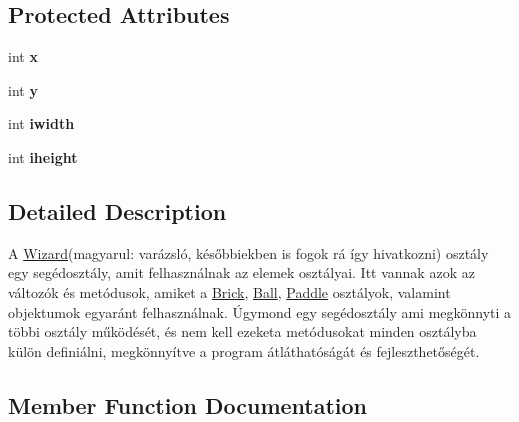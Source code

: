 \subsection*{Protected Attributes}
\begin{DoxyCompactItemize}
\item 
int {\bfseries x}\hypertarget{class_main_1_1_wizard_a6f623e01fc07da97597ba27c34a4974e}{}\label{class_main_1_1_wizard_a6f623e01fc07da97597ba27c34a4974e}

\item 
int {\bfseries y}\hypertarget{class_main_1_1_wizard_acec507c2727a6a2a5976c499444cd48f}{}\label{class_main_1_1_wizard_acec507c2727a6a2a5976c499444cd48f}

\item 
int {\bfseries iwidth}\hypertarget{class_main_1_1_wizard_ae710f20e4aba920201fd0cf66c8f71ab}{}\label{class_main_1_1_wizard_ae710f20e4aba920201fd0cf66c8f71ab}

\item 
int {\bfseries iheight}\hypertarget{class_main_1_1_wizard_acf427428af494d712b4f9f6d5adce18d}{}\label{class_main_1_1_wizard_acf427428af494d712b4f9f6d5adce18d}

\end{DoxyCompactItemize}


\subsection{Detailed Description}
A \hyperlink{class_main_1_1_wizard}{Wizard}(magyarul\+: varázsló, későbbiekben is fogok rá így hivatkozni) osztály egy segédosztály, amit felhasználnak az elemek osztályai. Itt vannak azok az változók és metódusok, amiket a \hyperlink{class_main_1_1_brick}{Brick}, \hyperlink{class_main_1_1_ball}{Ball}, \hyperlink{class_main_1_1_paddle}{Paddle} osztályok, valamint objektumok egyaránt felhasználnak. Úgymond egy segédosztály ami megkönnyti a többi osztály működését, és nem kell ezeketa metódusokat minden osztályba külön definiálni, megkönnyítve a program átláthatóságát és fejleszthetőségét. 

\subsection{Member Function Documentation}
